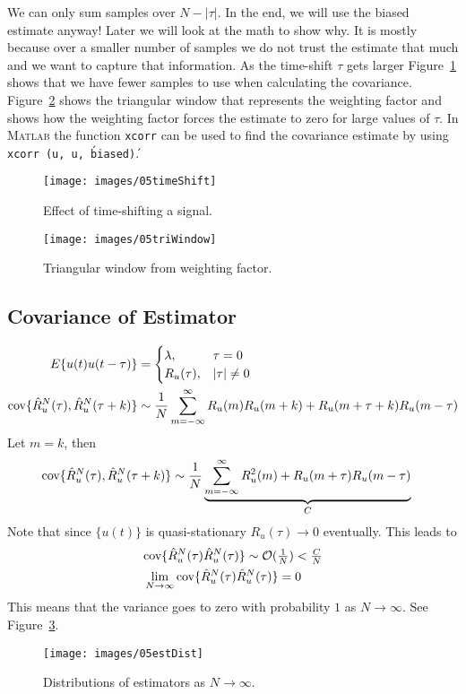 We can only sum samples over $N-|\tau|$.
In the end, we will use the biased estimate anyway! Later we will look at the math to show why.
It is mostly because over a smaller number of samples we do not trust the estimate that much and we want to capture that information.
As the time-shift $\tau$ gets larger Figure~\ref{fig:05timeShift} shows that we have fewer samples to use when calculating the covariance.
Figure~\ref{fig:05triWindow} shows the triangular window that represents the weighting factor and shows how the weighting factor forces the estimate to zero for large values of $\tau$.
In \textsc{Matlab} the function \texttt{xcorr} can be used to find the covariance estimate by using \texttt{xcorr (u, u, \'biased\')}.
\begin{figure}[ht!]
\centering
\texttt{[image: images/05timeShift]}
\caption{Effect of time-shifting a signal.}%
\label{fig:05timeShift}
\end{figure}

\begin{figure}[ht!]
\centering
\texttt{[image: images/05triWindow]}
\caption{Triangular window from weighting factor.}%
\label{fig:05triWindow}
\end{figure}

\subsection{Covariance of Estimator}
\begin{align*}
E\{u(t)u(t-\tau)\} &= \begin{cases} \lambda, & \tau=0 \\ R_u(\tau), & |\tau|\neq 0 \end{cases} \\
\text{cov}\{\hat{R}_u^N (\tau),\hat{R}_u^N(\tau+k)\} &\sim \frac{1}{N}\sum_{m=-\infty}^\infty R_u(m)R_u(m+k) + R_u(m+\tau+k)R_u(m-\tau)
\end{align*}
Let $m=k$, then
\begin{align*}
\text{cov}\{\hat{R}_u^N (\tau),\hat{R}_u^N(\tau+k)\} &\sim \frac{1}{N}\underbrace{\sum_{m=-\infty}^\infty R_u^2(m) + R_u(m+\tau)R_u(m-\tau)}_C
\end{align*}
Note that since $\{u(t)\}$ is quasi-stationary $R_u(\tau)\to0$ eventually.
This leads to
\begin{align*}
&\text{cov}\{\hat{R}_u^N (\tau)\hat{R}_u^N (\tau)\} \sim \mathcal{O}(\tfrac{1}{N}) < \tfrac{C}{N} \\
&\lim_{N\to\infty}\text{cov}\{\hat{R}_u^N (\tau)\hat{R}_u^N (\tau)\} = 0
\end{align*}
This means that the variance goes to zero with probability $1$ as $N\to\infty$.
See Figure~\ref{fig:05estDist}.
\begin{figure}[ht!]
\centering
\texttt{[image: images/05estDist]}
\caption{Distributions of estimators as $N\to\infty$.}%
\label{fig:05estDist}
\end{figure}

